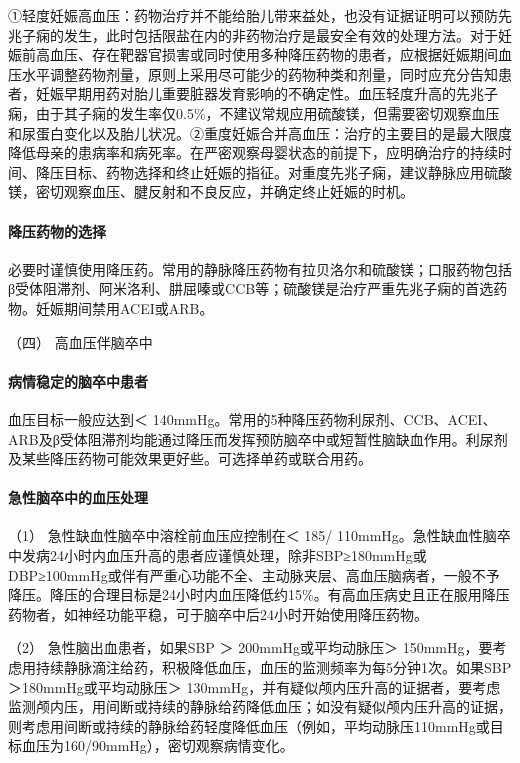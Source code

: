 ①轻度妊娠高血压：药物治疗并不能给胎儿带来益处，也没有证据证明可以预防先兆子痫的发生，此时包括限盐在内的非药物治疗是最安全有效的处理方法。对于妊娠前高血压、存在靶器官损害或同时使用多种降压药物的患者，应根据妊娠期间血压水平调整药物剂量，原则上采用尽可能少的药物种类和剂量，同时应充分告知患者，妊娠早期用药对胎儿重要脏器发育影响的不确定性。血压轻度升高的先兆子痫，由于其子痫的发生率仅0.5\%，不建议常规应用硫酸镁，但需要密切观察血压和尿蛋白变化以及胎儿状况。②重度妊娠合并高血压：治疗的主要目的是最大限度降低母亲的患病率和病死率。在严密观察母婴状态的前提下，应明确治疗的持续时间、降压目标、药物选择和终止妊娠的指征。对重度先兆子痫，建议静脉应用硫酸镁，密切观察血压、腱反射和不良反应，并确定终止妊娠的时机。

\paragraph{降压药物的选择}

必要时谨慎使用降压药。常用的静脉降压药物有拉贝洛尔和硫酸镁；口服药物包括β受体阻滞剂、阿米洛利、肼屈嗪或CCB等；硫酸镁是治疗严重先兆子痫的首选药物。妊娠期间禁用ACEI或ARB。

\hypertarget{text00409.htmlux5cux23CHP17-3-1-8-4}{}
（四） 高血压伴脑卒中

\paragraph{病情稳定的脑卒中患者}

血压目标一般应达到＜
140mmHg。常用的5种降压药物利尿剂、CCB、ACEI、ARB及β受体阻滞剂均能通过降压而发挥预防脑卒中或短暂性脑缺血作用。利尿剂及某些降压药物可能效果更好些。可选择单药或联合用药。

\paragraph{急性脑卒中的血压处理}

（1） 急性缺血性脑卒中溶栓前血压应控制在＜ 185/
110mmHg。急性缺血性脑卒中发病24小时内血压升高的患者应谨慎处理，除非SBP≥180mmHg或DBP≥100mmHg或伴有严重心功能不全、主动脉夹层、高血压脑病者，一般不予降压。降压的合理目标是24小时内血压降低约15\%。有高血压病史且正在服用降压药物者，如神经功能平稳，可于脑卒中后24小时开始使用降压药物。

（2） 急性脑出血患者，如果SBP ＞ 200mmHg或平均动脉压＞
150mmHg，要考虑用持续静脉滴注给药，积极降低血压，血压的监测频率为每5分钟1次。如果SBP
＞180mmHg或平均动脉压＞
130mmHg，并有疑似颅内压升高的证据者，要考虑监测颅内压，用间断或持续的静脉给药降低血压；如没有疑似颅内压升高的证据，则考虑用间断或持续的静脉给药轻度降低血压（例如，平均动脉压110mmHg或目标血压为160/90mmHg），密切观察病情变化。

